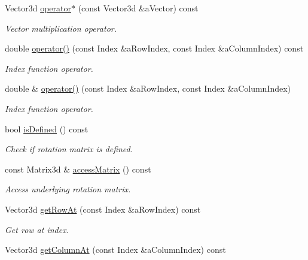 \begin{DoxyCompactItemize}
Vector3d \hyperlink{classostk_1_1math_1_1geom_1_1d3_1_1trf_1_1rot_1_1_rotation_matrix_a465bbadfbf1b2dcd31f66250a8cdf02b}{operator$\ast$} (const Vector3d \&a\+Vector) const
\begin{DoxyCompactList}\small\item\em Vector multiplication operator. \end{DoxyCompactList}\item 
double \hyperlink{classostk_1_1math_1_1geom_1_1d3_1_1trf_1_1rot_1_1_rotation_matrix_a6b34e5000608d95cbd31ff3231fbc907}{operator()} (const Index \&a\+Row\+Index, const Index \&a\+Column\+Index) const
\begin{DoxyCompactList}\small\item\em Index function operator. \end{DoxyCompactList}\item 
double \& \hyperlink{classostk_1_1math_1_1geom_1_1d3_1_1trf_1_1rot_1_1_rotation_matrix_a87615eecad4bc8ed57d75c88ccafdbe6}{operator()} (const Index \&a\+Row\+Index, const Index \&a\+Column\+Index)
\begin{DoxyCompactList}\small\item\em Index function operator. \end{DoxyCompactList}\item 
bool \hyperlink{classostk_1_1math_1_1geom_1_1d3_1_1trf_1_1rot_1_1_rotation_matrix_a981ba00e3a2c145c1e6c80c2e5aef996}{is\+Defined} () const
\begin{DoxyCompactList}\small\item\em Check if rotation matrix is defined. \end{DoxyCompactList}\item 
const Matrix3d \& \hyperlink{classostk_1_1math_1_1geom_1_1d3_1_1trf_1_1rot_1_1_rotation_matrix_a31ae7b4eceeb4fc1deb10276cab54efa}{access\+Matrix} () const
\begin{DoxyCompactList}\small\item\em Access underlying rotation matrix. \end{DoxyCompactList}\item 
Vector3d \hyperlink{classostk_1_1math_1_1geom_1_1d3_1_1trf_1_1rot_1_1_rotation_matrix_a4dc63a231000b99be5338210835e3d5c}{get\+Row\+At} (const Index \&a\+Row\+Index) const
\begin{DoxyCompactList}\small\item\em Get row at index. \end{DoxyCompactList}\item 
Vector3d \hyperlink{classostk_1_1math_1_1geom_1_1d3_1_1trf_1_1rot_1_1_rotation_matrix_aef6eccb1b43b8759c55f14427cd4c4f0}{get\+Column\+At} (const Index \&a\+Column\+Index) const

\end{DoxyCompactItemize}
